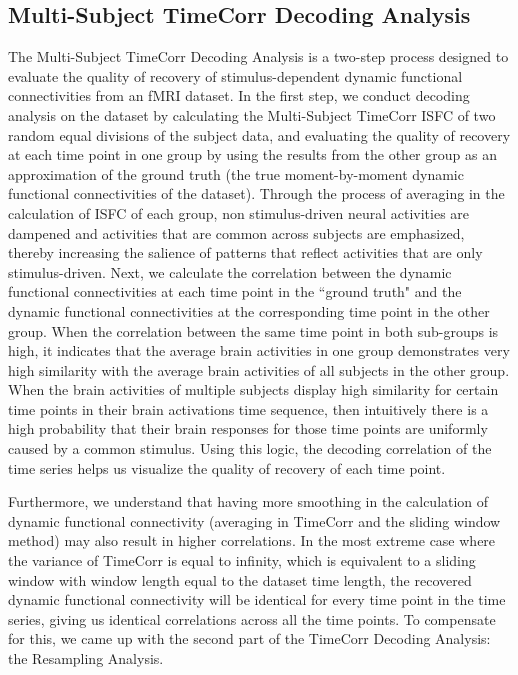 \documentclass[11pt]{article}
\begin{document}
\subsection{Multi-Subject TimeCorr Decoding Analysis}
The Multi-Subject TimeCorr Decoding Analysis is a two-step process designed to evaluate the quality of recovery of stimulus-dependent dynamic functional connectivities from an fMRI dataset. In the first step, we conduct decoding analysis on the dataset by calculating the Multi-Subject TimeCorr ISFC of two random equal divisions of the subject data, and evaluating the quality of recovery at each time point in one group by using the results from the other group as an approximation of the ground truth (the true moment-by-moment dynamic functional connectivities of the dataset). Through the process of averaging in the calculation of ISFC of each group, non stimulus-driven neural activities are dampened and activities that are common across subjects are emphasized, thereby increasing the salience of patterns that reflect activities that are only stimulus-driven. Next, we calculate the correlation between the dynamic functional connectivities at each time point in the ``ground truth" and the dynamic functional connectivities at the corresponding time point in the other group. When the correlation between the same time point in both sub-groups is high, it indicates that the average brain activities in one group demonstrates very high similarity with the average brain activities of all subjects in the other group. When the brain activities of multiple subjects display high similarity for certain time points in their brain activations time sequence, then intuitively there is a high probability that their brain responses for those time points are uniformly caused by a common stimulus. Using this logic, the decoding correlation of the time series helps us visualize the quality of recovery of each time point.

Furthermore, we understand that having more smoothing in the calculation of dynamic functional connectivity (averaging in TimeCorr and the sliding window method) may also result in higher correlations. In the most extreme case where the variance of TimeCorr is equal to infinity, which is equivalent to a sliding window with window length equal to the dataset time length, the recovered dynamic functional connectivity will be identical for every time point in the time series, giving us identical correlations across all the time points. To compensate for this, we came up with the second part of the TimeCorr Decoding Analysis: the Resampling Analysis.
\end{document}

